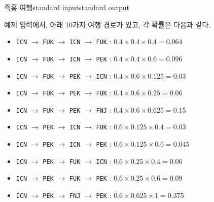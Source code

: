 \begin{problem}{즉흥 여행}{standard input}{standard output}
\Example

\begin{example}
%
\end{example}

\Notes
예제 입력에서, 아래 10가지 여행 경로가 있고, 각 확률은 다음과 같다.

\begin{itemize}
\item{\texttt{ICN} $\to$ \texttt{FUK} $\to$ \texttt{ICN} $\to$ \texttt{FUK} : $0.4 \times 0.4 \times 0.4 = 0.064$}
\item{\texttt{ICN} $\to$ \texttt{FUK} $\to$ \texttt{ICN} $\to$ \texttt{PEK} : $0.4 \times 0.4 \times 0.6 = 0.096$}
\item{\texttt{ICN} $\to$ \texttt{FUK} $\to$ \texttt{PEK} $\to$ \texttt{ICN} : $0.4 \times 0.6 \times 0.125 = 0.03$}
\item{\texttt{ICN} $\to$ \texttt{FUK} $\to$ \texttt{PEK} $\to$ \texttt{FUK} : $0.4 \times 0.6 \times 0.25 = 0.06$}
\item{\texttt{ICN} $\to$ \texttt{FUK} $\to$ \texttt{PEK} $\to$ \texttt{FNJ} : $0.4 \times 0.6 \times 0.625 = 0.15$}
\item{\texttt{ICN} $\to$ \texttt{PEK} $\to$ \texttt{ICN} $\to$ \texttt{FUK} : $0.6 \times 0.125 \times 0.4 = 0.03$}
\item{\texttt{ICN} $\to$ \texttt{PEK} $\to$ \texttt{ICN} $\to$ \texttt{PEK} : $0.6 \times 0.125 \times 0.6 = 0.045$}
\item{\texttt{ICN} $\to$ \texttt{PEK} $\to$ \texttt{FUK} $\to$ \texttt{ICN} : $0.6 \times 0.25 \times 0.4 = 0.06$}
\item{\texttt{ICN} $\to$ \texttt{PEK} $\to$ \texttt{FUK} $\to$ \texttt{PEK} : $0.6 \times 0.25 \times 0.6 = 0.09$}
\item{\texttt{ICN} $\to$ \texttt{PEK} $\to$ \texttt{FNJ} $\to$ \texttt{PEK} : $0.6 \times 0.625 \times 1 = 0.375$}
\end{itemize}

\end{problem}
